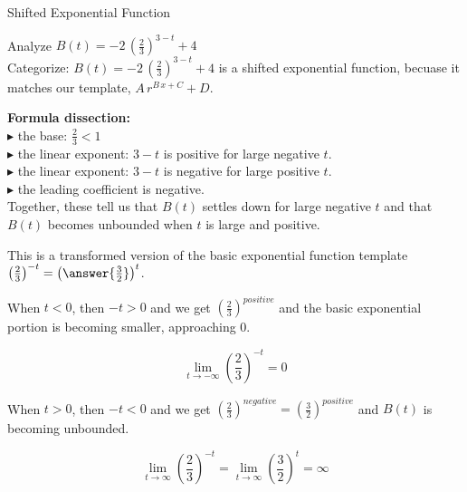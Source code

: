 \documentclass{ximera}
\begin{document}
\begin{example}  Shifted Exponential Function



Analyze   $B(t) = -2 \, \left( \frac{2}{3} \right)^{3-t} + 4$ \\


Categorize: $B(t) = -2 \, \left( \frac{2}{3} \right)^{3-t} + 4$ is a shifted exponential function, becuase it matches our template,  $A \, r^{B \, x + C} + D$. \\

\begin{idea}


\textbf{\textcolor{purple!85!blue}{Formula dissection:}}  \\


$\blacktriangleright$  the base: $\frac{2}{3} < 1$\\
$\blacktriangleright$  the linear exponent: $3-t$ is positive for large negative $t$. \\
$\blacktriangleright$  the linear exponent: $3-t$ is negative for large positive $t$. \\
$\blacktriangleright$  the leading coefficient is negative. \\


Together, these tell us that $B(t)$ settles down for large negative $t$ and that $B(t)$ becomes unbounded when $t$ is large and positive.



This is a transformed version of the basic exponential function template $\left( \frac{2}{3} \right)^{-t} = \left( \answer{\frac{3}{2}} \right)^t$.  



When $t < 0$, then $-t > 0$ and we get  $\left( \frac{2}{3} \right)^{positive}$ and the basic exponential portion is becoming smaller, approaching $0$.  





\[ \lim\limits_{t \to -\infty} \left( \frac{2}{3} \right)^{-t}  = 0 \]



When $t > 0$, then $-t < 0$ and we get  $\left( \frac{2}{3} \right)^{negative} = \left( \frac{3}{2} \right)^{positive}$ and $B(t)$ is becoming unbounded.  



\[ \lim\limits_{t \to \infty} \left( \frac{2}{3} \right)^{-t}  = \lim\limits_{t \to \infty} \left( \frac{3}{2} \right)^t  = \infty \]





\end{idea}
\end{example}
\end{document}

